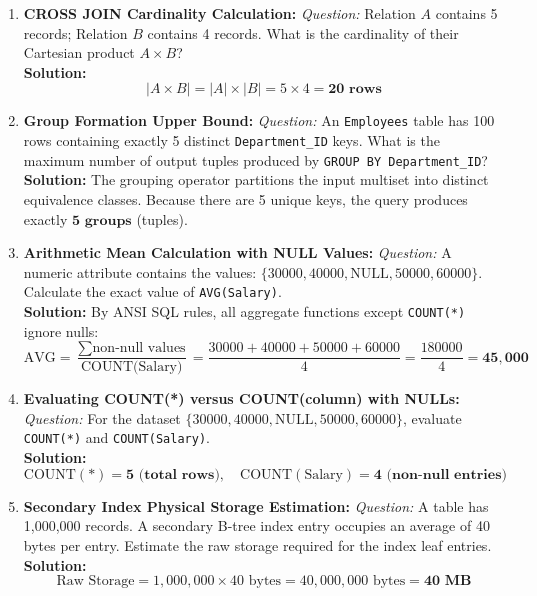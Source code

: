\begin{enumerate}[label=\textbf{Problem \arabic*.},leftmargin=1.5cm]
\item \textbf{CROSS JOIN Cardinality Calculation:}
\textit{Question:} Relation $A$ contains 5 records; Relation $B$ contains 4 records. What is the cardinality of their Cartesian product $A \times B$? \\
\textbf{Solution:}
\[
|A \times B| = |A| \times |B| = 5 \times 4 = \mathbf{20\text{ rows}}
\]

\item \textbf{Group Formation Upper Bound:}
\textit{Question:} An \texttt{Employees} table has 100 rows containing exactly 5 distinct \texttt{Department\_ID} keys. What is the maximum number of output tuples produced by \texttt{GROUP BY Department\_ID}? \\
\textbf{Solution:} The grouping operator partitions the input multiset into distinct equivalence classes. Because there are 5 unique keys, the query produces exactly $\mathbf{5\text{ groups}}$ (tuples).

\item \textbf{Arithmetic Mean Calculation with NULL Values:}
\textit{Question:} A numeric attribute contains the values: $\{30000, 40000, \text{NULL}, 50000, 60000\}$. Calculate the exact value of \texttt{AVG(Salary)}. \\
\textbf{Solution:} By ANSI SQL rules, all aggregate functions except \texttt{COUNT(*)} ignore nulls:
\[
\text{AVG} = \frac{\sum \text{non-null values}}{\text{COUNT(Salary)}} = \frac{30000 + 40000 + 50000 + 60000}{4} = \frac{180000}{4} = \mathbf{45,000}
\]

\item \textbf{Evaluating COUNT(*) versus COUNT(column) with NULLs:}
\textit{Question:} For the dataset $\{30000, 40000, \text{NULL}, 50000, 60000\}$, evaluate \texttt{COUNT(*)} and \texttt{COUNT(Salary)}. \\
\textbf{Solution:}
\[
\text{COUNT}(*) = \mathbf{5\text{ (total rows)}}, \quad \text{COUNT}(\text{Salary}) = \mathbf{4\text{ (non-null entries)}}
\]

\item \textbf{Secondary Index Physical Storage Estimation:}
\textit{Question:} A table has 1,000,000 records. A secondary B-tree index entry occupies an average of 40 bytes per entry. Estimate the raw storage required for the index leaf entries. \\
\textbf{Solution:}
\[
\text{Raw Storage} = 1,000,000 \times 40\text{ bytes} = 40,000,000\text{ bytes} = \mathbf{40\text{ MB}}
\]


\end{enumerate}
